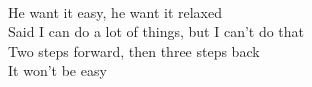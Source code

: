 \\
He want it easy, he want it relaxed \\
Said I can do a lot of things, but I can't do that \\
Two steps forward, then three steps back \\
It won't be easy \\
